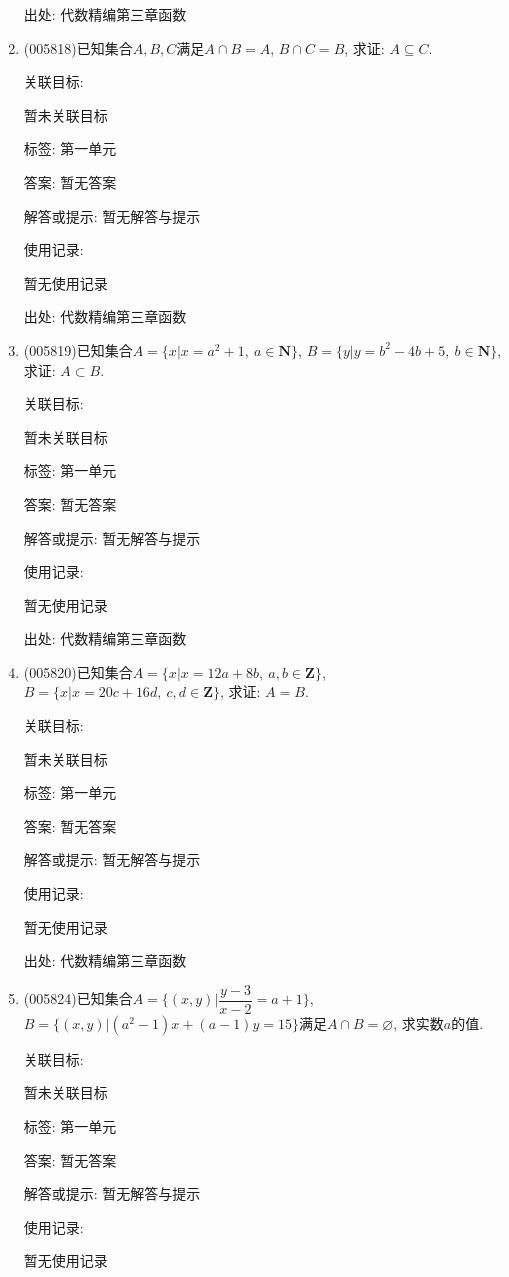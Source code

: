 \documentclass[10pt,a4paper]{article}
\begin{document}
\begin{enumerate}[1.]
出处: 代数精编第三章函数
\item { (005818)}已知集合$A,B,C$满足$A\cap B=A$, $B\cap C=B$, 求证: $A\subseteq C$.


关联目标:

暂未关联目标



标签: 第一单元

答案: 暂无答案

解答或提示: 暂无解答与提示

使用记录:

暂无使用记录


出处: 代数精编第三章函数
\item { (005819)}已知集合$A=\{x|x=a^2+1,\ a\in \mathbf{N}\}$, $B=\{y|y=b^2-4b+5,\ b\in \mathbf{N}\}$, 求证: $A\subset B$.


关联目标:

暂未关联目标



标签: 第一单元

答案: 暂无答案

解答或提示: 暂无解答与提示

使用记录:

暂无使用记录


出处: 代数精编第三章函数
\item { (005820)}已知集合$A=\{x|x=12a+8b,\ a,b\in \mathbf{Z}\}$, $B=\{x|x=20c+16d,\ c,d\in \mathbf{Z}\}$, 求证: $A=B$.


关联目标:

暂未关联目标



标签: 第一单元

答案: 暂无答案

解答或提示: 暂无解答与提示

使用记录:

暂无使用记录


出处: 代数精编第三章函数
\item { (005824)}已知集合$A=\{(x,y)|\dfrac{y-3}{x-2}=a+1\}$, $B=\{(x,y)|(a^2-1)x+(a-1)y=15\}$满足$A\cap B=\varnothing$, 求实数$a$的值.


关联目标:

暂未关联目标



标签: 第一单元

答案: 暂无答案

解答或提示: 暂无解答与提示

使用记录:

暂无使用记录



\end{enumerate}
\end{document}
